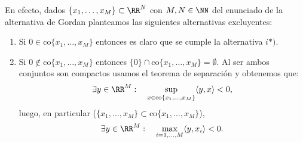 En efecto, dados $ \{x_1,\dots, x_M \} \subset \RR^N $ con $ M, N \in \NN  $ del enunciado de la alternativa de Gordan planteamos las siguientes alternativas excluyentes:
\begin{enumerate}
\item Si $ 0 \in \mathrm{co}\{x_1,\dots, x_M \} $ entonces es claro que se cumple la alternativa $ i*) $.
\item Si $ 0 \notin \mathrm{co}\{x_1,\dots, x_M \} $ entonces $ \{0\} \cap \mathrm{co}\{x_1,\dots, x_M \} = \emptyset $. Al ser ambos conjuntos son compactos usamos el teorema de separación y obtenemos que:
\[
\exists y \in \RR^M: \quad \sup_{x \in \mathrm{co}\{x_1,\dots, x_M \}} \langle y, x \rangle < 0,
\]
luego, en particular ($ \{x_1,\dots, x_M \} \subset \mathrm{co}\{x_1,\dots, x_M \}   $),
\[
\exists y \in \RR^M: \quad \max_{i = 1,\dots, M} \langle y, x_i \rangle < 0.
\]
\end{enumerate}